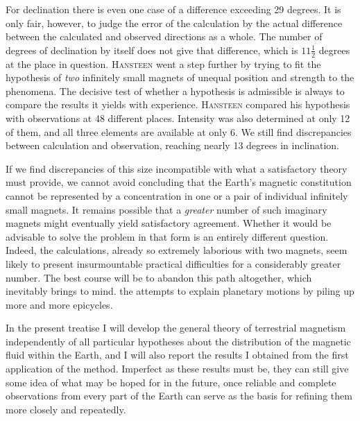 \expandafter\def\csname HistoricalNoteText14\endcsname{For declination there is even one case of a difference exceeding 29 degrees. It is only fair, however, to judge the error of the calculation by the actual difference between the calculated and observed directions as a whole. The number of degrees of declination by itself does not give that difference, which is $11\frac{1}{2}$ degrees at the place in question.}
\textsc{Hansteen} went a step further by trying to fit the hypothesis of \textit{two} infinitely small magnets of unequal position and strength to the phenomena. The decisive test of whether a hypothesis is admissible is always to compare the results it yields with experience. \textsc{Hansteen} compared his hypothesis with observations at 48 different places. Intensity was also determined at only 12 of them, and all three elements are available at only 6. We still find discrepancies between calculation and observation, reaching nearly 13 degrees in inclination.

If we find discrepancies of this size incompatible with what a satisfactory theory must provide, we cannot avoid concluding that the Earth's magnetic constitution cannot be represented by a concentration in one or a pair of individual infinitely small magnets. It remains possible that a \textit{greater} number of such imaginary magnets might eventually yield satisfactory agreement. Whether it would be advisable to solve the problem in that form is an entirely different question. Indeed, the calculations, already so extremely laborious with two magnets, seem likely to present insurmountable practical difficulties for a considerably greater number. The best course will be to abandon this path altogether, which inevitably brings to mind. the attempts to explain planetary motions by piling up more and more epicycles.

In the present treatise I will develop the general theory of terrestrial magnetism independently of all particular hypotheses about the distribution of the magnetic fluid within the Earth, and I will also report the results I obtained from the first application of the method. Imperfect as these results must be, they can still give some idea of what may be hoped for in the future, once reliable and complete observations from every part of the Earth can serve as the basis for refining them more closely and repeatedly.

